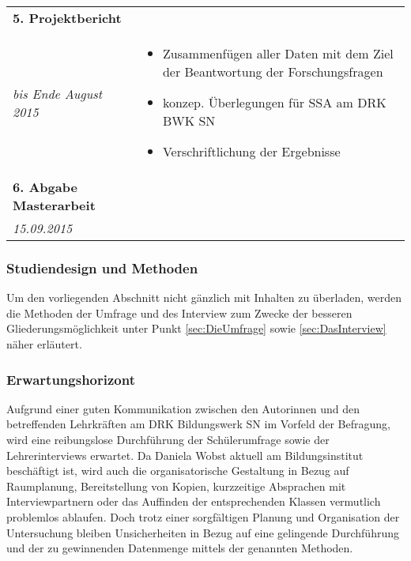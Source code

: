 \begin{longtable}{l|p{9.8cm}}
	\textbf{5. Projektbericht} & \\*
	\emph{bis Ende August 2015} &
	\vspace*{-0.6cm}
	\begin{itemize}[nosep,topsep=-0.6cm]
		\item Zusammenfügen aller Daten mit dem Ziel der Beantwortung der Forschungsfragen
		\item konzep. Überlegungen für SSA am DRK BWK SN
		\item Verschriftlichung der Ergebnisse
	\end{itemize} \\
	
	\textbf{6. Abgabe Masterarbeit} & \\*
	\emph{15.09.2015} & \\
	
\end{longtable}

\newpage

\subsubsection{Studiendesign und Methoden}
\label{sec:StudiendesignUndMethoden}

Um den vorliegenden Abschnitt nicht gänzlich mit Inhalten zu überladen, werden die Methoden der Umfrage und des Interview zum Zwecke der besseren Gliederungsmöglichkeit unter Punkt \ref{sec:DieUmfrage} sowie \ref{sec:DasInterview} näher erläutert.

\subsubsection{Erwartungshorizont}
\label{sec:Erwartungshorizont}

Aufgrund einer guten Kommunikation zwischen den Autorinnen und den betreffenden Lehrkräften am DRK Bildungswerk SN im Vorfeld der Befragung, wird eine reibungslose Durchführung der Schülerumfrage sowie der Lehrerinterviews erwartet. Da Daniela Wobst aktuell am Bildungsinstitut beschäftigt ist, wird auch die organisatorische Gestaltung in Bezug auf Raumplanung, Bereitstellung von Kopien, kurzzeitige Absprachen mit Interviewpartnern oder das Auffinden der entsprechenden Klassen vermutlich problemlos ablaufen. Doch trotz einer sorgfältigen Planung und Organisation der Untersuchung bleiben Unsicherheiten in Bezug auf eine gelingende Durchführung und der zu gewinnenden Datenmenge mittels der genannten Methoden.

